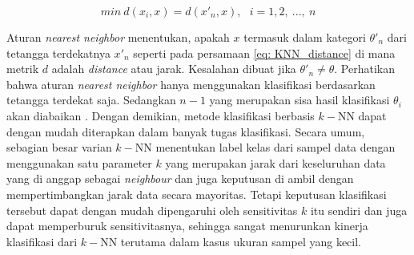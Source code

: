 \begin{equation}\label{eq: KNN_distance}
min\ d(x_{i}, x) = d(x'_{n}, x),\ \ \ i = 1, 2,\ ...,\ n
\end{equation}

Aturan \textit{nearest neighbor} menentukan, apakah $x$ termasuk dalam kategori $\theta'_{n}$ dari tetangga terdekatnya $x'_{n}$ seperti pada persamaan \ref{eq: KNN_distance} di mana metrik $d$ adalah \textit{distance} atau jarak. Kesalahan dibuat jika $\theta'_{n} \neq \theta$. Perhatikan bahwa aturan \textit{nearest neighbor} hanya menggunakan klasifikasi berdasarkan tetangga terdekat saja. Sedangkan $n - 1$ yang merupakan sisa hasil klasifikasi $\theta_{i}$ akan diabaikan \citep{Cover1967}. Dengan demikian, metode klasifikasi berbasis $k-$NN dapat dengan mudah diterapkan dalam banyak tugas klasifikasi. Secara umum, sebagian besar varian $k-$NN menentukan label kelas dari sampel data dengan menggunakan satu parameter $k$ yang merupakan jarak dari keseluruhan data yang di anggap sebagai \textit{neighbour} dan juga keputusan di ambil dengan mempertimbangkan jarak data secara mayoritas. Tetapi keputusan klasifikasi tersebut dapat dengan mudah dipengaruhi oleh sensitivitas $k$ itu sendiri dan juga dapat memperburuk sensitivitasnya, sehingga sangat menurunkan kinerja klasifikasi dari $k-$NN terutama dalam kasus ukuran sampel yang kecil.

